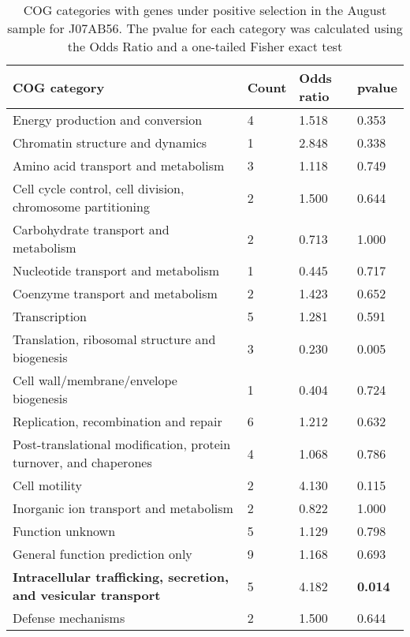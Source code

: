\begin{table}[hb]
\footnotesize 
	\tabcolsep=0.11cm 
\caption{COG categories with genes under positive selection in the August sample for J07AB56. The pvalue for each category was calculated using the Odds Ratio and a one-tailed Fisher exact test} 
\begin{tabularx}{\textwidth}{L{6cm}R{2cm}R{2cm}R{2cm}} 
\hline 
\textbf{COG category} & \textbf{Count} & \textbf{Odds ratio} & \textbf{pvalue} \\ 
\hline 
Energy production and conversion & 4 & 1.518 & 0.353 \\ 
Chromatin structure and dynamics & 1 & 2.848 & 0.338 \\ 
Amino acid transport and metabolism & 3 & 1.118 & 0.749 \\ 
Cell cycle control, cell division, chromosome partitioning & 2 & 1.500 & 0.644 \\ 
Carbohydrate transport and metabolism & 2 & 0.713 & 1.000 \\ 
Nucleotide transport and metabolism & 1 & 0.445 & 0.717 \\ 
Coenzyme transport and metabolism & 2 & 1.423 & 0.652 \\ 
Transcription & 5 & 1.281 & 0.591 \\ 
Translation, ribosomal structure and biogenesis & 3 & 0.230 & 0.005 \\ 
Cell wall/membrane/envelope biogenesis & 1 & 0.404 & 0.724 \\ 
Replication, recombination and repair & 6 & 1.212 & 0.632 \\ 
Post-translational modification, protein turnover, and chaperones & 4 & 1.068 & 0.786 \\ 
Cell motility & 2 & 4.130 & 0.115 \\ 
Inorganic ion transport and metabolism & 2 & 0.822 & 1.000 \\ 
Function unknown & 5 & 1.129 & 0.798 \\ 
General function prediction only & 9 & 1.168 & 0.693 \\ 
\textbf{Intracellular trafficking, secretion, and vesicular transport} & 5 & 4.182 & \textbf{0.014} \\ 
Defense mechanisms & 2 & 1.500 & 0.644 \\ 
\end{tabularx} 
\label{August_COG_Selection_J07AB56} 
 \end{table} 

